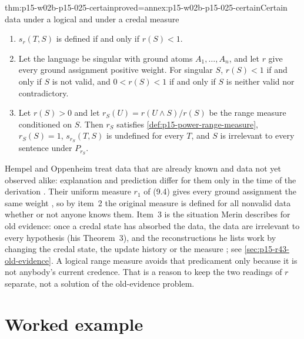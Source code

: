 \begin{hbtheorem}{thm:p15-w02b-p15-025-certain}{proved=annex:p15-w02b-p15-025-certain}{Certain data under a logical and under a credal measure}
\begin{enumerate}
\item \(s_r(T,S)\) is defined if and only if \(r(S)<1\).
\item Let the language be singular with ground atoms \(A_1,\ldots,A_n\),
and let \(r\) give every ground assignment positive weight. For singular
\(S\), \(r(S)<1\) if and only if \(S\) is not valid, and
\(0<r(S)<1\) if and only if \(S\) is neither valid nor contradictory.
\item Let \(r(S)>0\) and let \(r_S(U)=r(U\wedge S)/r(S)\) be the range
measure conditioned on \(S\). Then \(r_S\) satisfies
\cref{def:p15-power-range-measure}, \(r_S(S)=1\), \(s_{r_S}(T,S)\) is
undefined for every \(T\), and \(S\) is irrelevant to every sentence
under \(P_{r_S}\).
\end{enumerate}
\end{hbtheorem}

Hempel and Oppenheim treat data that are already known and data not yet
observed alike: explanation and prediction differ for them only in the
time of the derivation \cite[p.~164]{HempelOppenheim1948Explanation}.
Their uniform measure \(r_1\) of (9.4) gives every ground assignment the
same weight \cite[p.~170]{HempelOppenheim1948Explanation}, so by item~2
the original measure is defined for all nonvalid data whether or not
anyone knows them. Item~3 is the situation Merin describes for old
evidence: once a credal state has absorbed the data, the data are
irrelevant to every hypothesis (his Theorem~3), and the reconstructions
he lists work by changing the credal state, the update history or the
measure \cite[pp.~266, 268]{Merin2021Relevance}; see
\cref{sec:p15-r43-old-evidence}. A logical range measure avoids that
predicament only because it is not anybody's current credence. That is
a reason to keep the two readings of \(r\) separate, not a solution of
the old-evidence problem.

\section{Worked example}
\label{sec:p15-w02b-p15-025-example}

